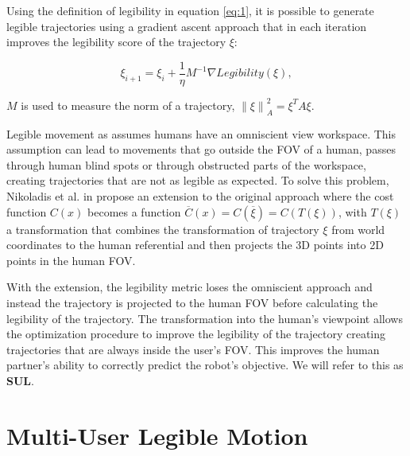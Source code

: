 \documentclass[letterpaper, 10 pt, conference]{ieeeconf}
\newcommand{\norm}[1]{\left\lVert#1\right\rVert}
\begin{document}
Using the definition of legibility in equation \ref{eq:1}, it is possible to generate legible trajectories using a gradient ascent approach that in each iteration improves the legibility score of the trajectory $\xi$:

\begin{equation}
    \label{eq:3}
	\xi_{i+1} = \xi_i + \frac{1}{\eta} M^{-1} \nabla Legibility(\xi),
\end{equation}

$M$ is used to measure the norm of a trajectory, $\norm{\xi}^2_A = \xi^T A \xi$.

Legible movement as \cite{dragan2013hri} assumes humans have an omniscient view workspace. This assumption can lead to movements that go outside the \ac{FOV} of a human, passes through human blind spots or through obstructed parts of the workspace, creating trajectories that are not as legible as expected. To solve this problem, Nikoladis et al. in \cite{nikolaidis2016hri} propose an extension to the original approach where the cost function $C(x)$ becomes a function $\overline{C}(x) = C(\overline{\xi}) = C(T(\xi))$, with $T(\xi)$ a transformation that combines the transformation of trajectory $\xi$ from world coordinates to the human referential and then projects the 3D points into 2D points in the human \ac{FOV}.

With the extension, the legibility metric loses the omniscient approach and instead the trajectory is projected to the human \ac{FOV} before calculating the legibility of the trajectory. The transformation into the human's viewpoint allows the optimization procedure to improve the legibility of the trajectory creating trajectories that are always inside the user's \ac{FOV}. This improves the human partner's ability to correctly predict the robot's objective. \cite{nikolaidis2016hri} We will refer to this as \textbf{\ac{SUL}}.


\section{Multi-User Legible Motion}
\label{sec:multi-user-legibility}
\end{document}
